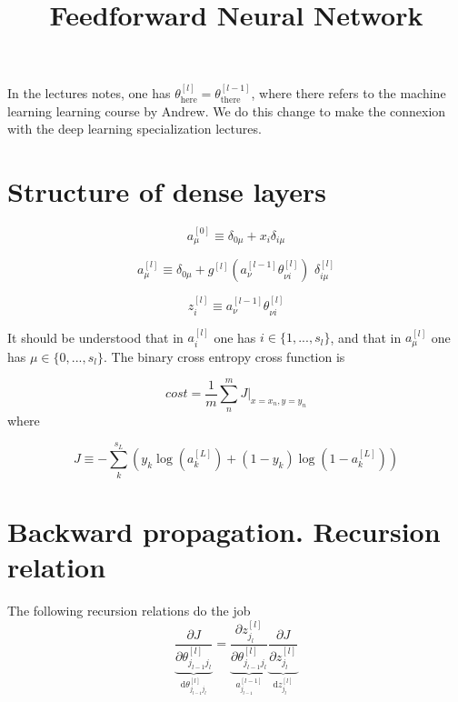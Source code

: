 \documentclass[a4paper,11pt]{article}
\title{Feedforward Neural Network}
\newcommand{\dd}{\text{d}}
\newcommand{\na}[2]{a_{#1}^{[#2]}}
\newcommand{\nz}[2]{z_{#1}^{[#2]}}
\newcommand{\na}[3]{a_{#1 #2}^{[#2]}}
\newcommand{\nz}[3]{z_{#1 #2}^{[#2]}}
\newcommand{\nt}[3]{\theta_{#1 #2}^{[#3]}}
\newcommand{\nt}[4]{\theta_{#1 #2 #3}^{[#4]}}
\newcommand{\ff}[2]{#1 \left(#2 \right)}
\begin{document}
In the lectures notes, one has $\theta^{[l]}_{\text{here}}=\theta^{[l-1]}_{\text{there}}$, where
there refers to the machine learning learning course by Andrew.
We do this change to make the connexion with the
deep learning specialization lectures.


\section{Structure of dense layers}


\begin{equation}
    \na{\mu}{0} \equiv \delta_{0\mu}+x_i\delta_{i\mu}  %
\end{equation}

\begin{equation}
    \na{\mu}{l} \equiv \delta_{0\mu} +
    \ff{g^{[l]}}{ \na{\nu }{l-1} \nt{\nu}{i}{l}  }\,\, \delta_{i\mu}^{[l]}  %
\end{equation}

\begin{equation}
    \nz{i}{l}\equiv\na{\nu }{l-1}  \nt{\nu}{i}{l} %
\end{equation}

It should be understood that in $\na{i}{l}$
one has  $i \in \{1,..., s_l\} $,
and that in $\na{\mu}{l}$ one has $ \mu \in \{0,..., s_l\}$. The binary cross entropy cross function is

\begin{equation}
    cost=\frac1m \sum^m_n
    J \Big\vert_{x=x_n,y=y_n}  %
\end{equation}
where

\begin{equation}
    J\equiv -\sum^{s_L}_k
    \left(
        y_k\ff{\log}{\na{k}{L}}  %
        +(1-y_k)\ff{\log}{1-\na{k}{L}}
    \right)
\end{equation}





\section{Backward propagation.  Recursion relation}

The following recursion relations do the job
\begin{equation}
    \underbrace{
    \frac{\partial J }{\partial  \nt{j_{l-1}}{j_{l}}{l}  }
    }_{\dd  \nt{j_{l-1}}{j_l}{l} }
   =
   \underbrace{
    \frac{\partial \nz{j_l}{l} }{\partial \nt{j_{l-1}}{j_l}{l}  }
    }_{ \na{j_{l-1}}{l-1} }
   \underbrace{
    \frac{\partial J  }{\partial \nz{j_l}{l} }
    }_{\dd  \nz{j_{l}}{l} }
\end{equation}
\end{document}
